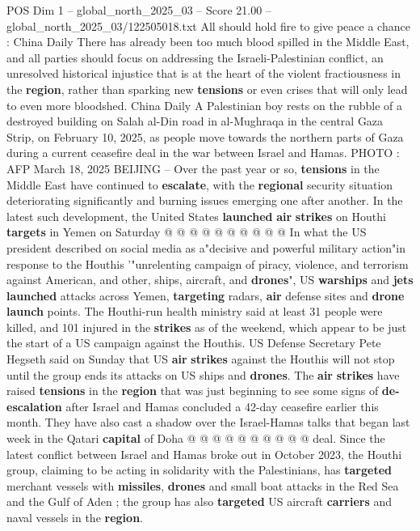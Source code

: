 \begin{textsample}{POS Dim 1 – global\_north\_2025\_03 – Score 21.00 – global\_north\_2025\_03/122505018.txt}  \label{ex:f1_pos_423}
All should hold fire to give peace a chance : China Daily There has already been too much blood spilled in the Middle East, and all parties should focus on addressing the Israeli-Palestinian conflict, an unresolved historical injustice that is at the heart of the violent fractiousness in the \textbf{region}, rather than sparking new \textbf{tensions} or even crises that will only lead to even more bloodshed.
China Daily A Palestinian boy rests on the rubble of a destroyed building on Salah al-Din road in al-Mughraqa in the central Gaza Strip, on February 10, 2025, as people move towards the northern parts of Gaza during a current ceasefire deal in the war between Israel and Hamas.
PHOTO : AFP March 18, 2025 BEIJING -- Over the past year or so, \textbf{tensions} in the Middle East have continued to \textbf{escalate}, with the \textbf{regional} security situation deteriorating significantly and burning issues emerging one after another.
In the latest such development, the United States \textbf{launched} \textbf{air} \textbf{strikes} on Houthi \textbf{targets} in Yemen on Saturday @ @ @ @ @ @ @ @ @ @ In what the US president described on social media as a"decisive and powerful military action"in response to the Houthis '"unrelenting campaign of piracy, violence, and terrorism against American, and other, ships, aircraft, and \textbf{drones}", US \textbf{warships} and \textbf{jets} \textbf{launched} attacks across Yemen, \textbf{targeting} radars, \textbf{air} defense sites and \textbf{drone} \textbf{launch} points.
The Houthi-run health ministry said at least 31 people were killed, and 101 injured in the \textbf{strikes} as of the weekend, which appear to be just the start of a US campaign against the Houthis.
US Defense Secretary Pete Hegseth said on Sunday that US \textbf{air} \textbf{strikes} against the Houthis will not stop until the group ends its attacks on US ships and \textbf{drones}.
The \textbf{air} \textbf{strikes} have raised \textbf{tensions} in the \textbf{region} that was just beginning to see some signs of \textbf{de-escalation} after Israel and Hamas concluded a 42-day ceasefire earlier this month.
They have also cast a shadow over the Israel-Hamas talks that began last week in the Qatari \textbf{capital} of Doha @ @ @ @ @ @ @ @ @ @ deal.
Since the latest conflict between Israel and Hamas broke out in October 2023, the Houthi group, claiming to be acting in solidarity with the Palestinians, has \textbf{targeted} merchant vessels with \textbf{missiles}, \textbf{drones} and small boat attacks in the Red Sea and the Gulf of Aden ; the group has also \textbf{targeted} US aircraft \textbf{carriers} and naval vessels in the \textbf{region}.

\end{textsample}
